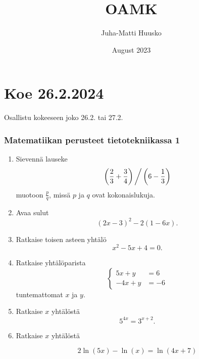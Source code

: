 \documentclass[12pt]{article}
\title{OAMK}
\author{Juha-Matti Huusko}
\date{August 2023}
\renewcommand{\ratkaisu}[1]{{\color{blue}\quad\textrm{Ratkaisu: } #1}}
\renewcommand{\ratkaisu}[1]{}
\begin{document}
\thispagestyle{empty}

\section*{Koe 26.2.2024}
Osallistu kokeeseen joko 26.2. tai 27.2.
\subsubsection*{Matematiikan perusteet tietotekniikassa 1}

\begin{enumerate}
\item Sievennä lauseke
$$\left(\frac23+\frac34\right)\bigg/\left(6-\frac13\right)$$\ratkaisu{1/4} %
muotoon $\frac{p}{q}$, missä $p$ ja $q$ ovat kokonaislukuja.

\item Avaa sulut
$$(2x-3)^2-2(1-6x).$$\ratkaisu{$4x^2+7$} %


\item Ratkaise toisen asteen yhtälö
$$x^2-5x+4=0.$$\ratkaisu{$x=1,x=4$}


\item Ratkaise yhtälöparista
$$
\begin{cases}
5x+y&=6\\
-4x+y&=-6
\end{cases}\ratkaisu{$x=4/3, y=-2/3$}
$$
tuntemattomat $x$ ja $y$.

\def\a{5}\def\b{4}\def\c{3}\def\d{2} %


\item Ratkaise $x$ yhtälöstä
$$
\a^{\b x}=\c^{x+\d}.
$$
\ratkaisu{$x=\frac{\d \ln(\c)}{\b \ln(\a)-\ln(\c)}$}

\item Ratkaise $x$ yhtälöstä

$$2\ln(5x)-\ln(x)=\ln(4x+7)$$\ratkaisu{$x=1/24$}


\end{enumerate}
\end{document}
